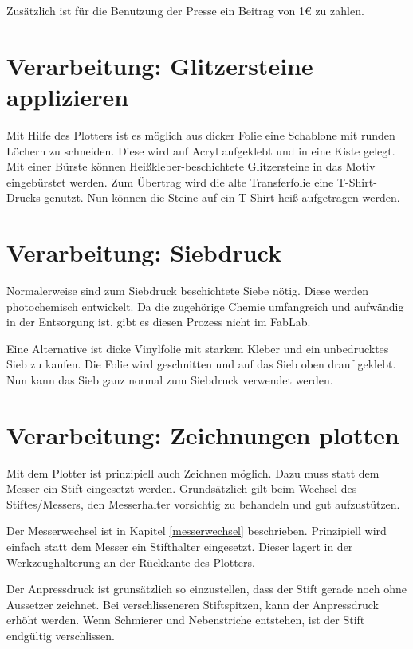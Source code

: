 \documentclass{\basedir/fablab-document}
\begin{document}
Zusätzlich ist für die Benutzung der Presse ein Beitrag von 1€ zu zahlen.

\section{Verarbeitung: Glitzersteine applizieren}
Mit Hilfe des Plotters ist es möglich aus dicker Folie eine Schablone mit runden Löchern zu schneiden.
Diese wird auf Acryl aufgeklebt und in eine Kiste gelegt.
Mit einer Bürste können Heißkleber-beschichtete Glitzersteine in das Motiv eingebürstet werden.
Zum Übertrag wird die alte Transferfolie eine T-Shirt-Drucks genutzt.
Nun können die Steine auf ein T-Shirt heiß aufgetragen werden.
\section{Verarbeitung: Siebdruck}
Normalerweise sind zum Siebdruck beschichtete Siebe nötig.
Diese werden photochemisch entwickelt.
Da die zugehörige Chemie umfangreich und aufwändig in der Entsorgung ist, gibt es diesen Prozess nicht im FabLab.

Eine Alternative ist dicke Vinylfolie mit starkem Kleber und ein unbedrucktes Sieb zu kaufen.
Die Folie wird geschnitten und auf das Sieb oben drauf geklebt.
Nun kann das Sieb ganz normal zum Siebdruck verwendet werden.
\section{Verarbeitung: Zeichnungen plotten}
Mit dem Plotter ist prinzipiell auch Zeichnen möglich.
Dazu muss statt dem Messer ein Stift eingesetzt werden.
Grundsätzlich gilt beim Wechsel des Stiftes/Messers, den Messerhalter vorsichtig zu behandeln und gut aufzustützen.

Der Messerwechsel ist in Kapitel \ref{messerwechsel} beschrieben.
Prinzipiell wird einfach statt dem Messer ein Stifthalter eingesetzt.
Dieser lagert in der Werkzeughalterung an der Rückkante des Plotters.

Der Anpressdruck ist grunsätzlich so einzustellen, dass der Stift gerade noch ohne Aussetzer zeichnet.
Bei verschlisseneren Stiftspitzen, kann der Anpressdruck erhöht werden.
Wenn Schmierer und Nebenstriche entstehen, ist der Stift endgültig verschlissen.

\end{document}
